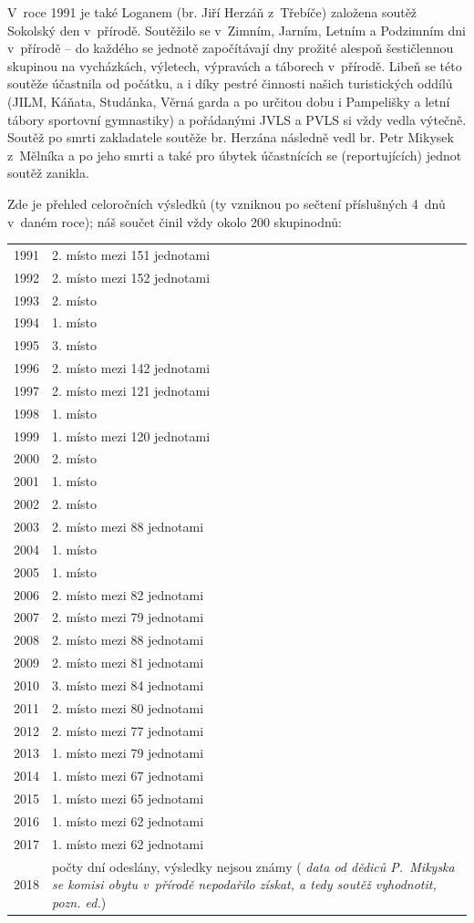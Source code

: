 \documentclass[a5paper, 11pt, twoside]{article}
\newcommand{\pozned}[1]{%
\textit{#1}}
\begin{document}
V~roce 1991 je také Loganem (br. Jiří Herzáň z~Třebíče) založena soutěž
Sokolský den v~přírodě. Soutěžilo se v~Zimním, Jarním, Letním a
Podzimním dni v~přírodě -- do každého se jednotě započítávají dny
prožité alespoň šestičlennou skupinou na vycházkách, výletech, výpravách
a táborech v~přírodě. Libeň se této soutěže účastnila od počátku, a i
díky pestré činnosti našich turistických oddílů (JILM, Káňata, Studánka,
Věrná garda a po určitou dobu i Pampelišky a letní tábory sportovní
gymnastiky) a pořádanými JVLS a PVLS si vždy vedla výtečně. Soutěž po
smrti zakladatele soutěže br. Herzána následně vedl br. Petr Mikysek
z~Mělníka a po jeho smrti a také pro úbytek účastnících se (reportujících)
jednot soutěž zanikla.

{\sloppy Zde je přehled celoročních výsledků (ty vzniknou po sečtení příslušných 4~dnů v~daném roce); náš součet činil vždy okolo 200 skupinodnů: \par}

\renewcommand{\arraystretch}{1}
\begin{longtable}{l p{10.2cm}}
1991 & 2. místo mezi 151 jednotami \\
1992 & 2. místo mezi 152 jednotami \\
1993 & 2. místo \\
1994 & 1. místo \\
1995 & 3. místo \\
1996 & 2. místo mezi 142 jednotami \\
1997 & 2. místo mezi 121 jednotami \\
1998 & 1. místo \\
1999 & 1. místo mezi 120 jednotami \\
2000 & 2. místo \\
2001 & 1. místo \\
2002 & 2. místo \\
2003 & 2. místo mezi 88 jednotami \\
2004 & 1. místo \\
2005 & 1. místo \\
2006 & 2. místo mezi 82 jednotami \\
2007 & 2. místo mezi 79 jednotami \\
2008 & 2. místo mezi 88 jednotami \\
2009 & 2. místo mezi 81 jednotami \\
2010 & 3. místo mezi 84 jednotami \\
2011 & 2. místo mezi 80 jednotami \\
2012 & 2. místo mezi 77 jednotami \\
2013 & 1. místo mezi 79 jednotami \\
2014 & 1. místo mezi 67 jednotami \\
2015 & 1. místo mezi 65 jednotami \\
2016 & 1. místo mezi 62 jednotami \\
2017 & 1. místo mezi 62 jednotami \\
2018 & počty dní odeslány, výsledky nejsou známy (\pozned{data od dědiců P.~Mikyska se komisi obytu v~přírodě nepodařilo získat, a tedy soutěž vyhodnotit, pozn. ed.}) \\
\end{longtable}
\end{document}
